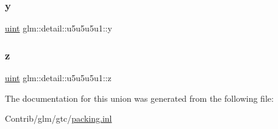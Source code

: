 \subsubsection{\texorpdfstring{y}{y}}
{\footnotesize\ttfamily \mbox{\hyperlink{group__core__precision_ga4fd29415871152bfb5abd588334147c8}{uint}} glm\+::detail\+::u5u5u5u1\+::y}

\mbox{\label{unionglm_1_1detail_1_1u5u5u5u1_a110d067e1f37f6137c2806102c4508f6}} 
\subsubsection{\texorpdfstring{z}{z}}
{\footnotesize\ttfamily \mbox{\hyperlink{group__core__precision_ga4fd29415871152bfb5abd588334147c8}{uint}} glm\+::detail\+::u5u5u5u1\+::z}



The documentation for this union was generated from the following file\+:\begin{DoxyCompactItemize}
\item 
Contrib/glm/gtc/\mbox{\hyperlink{packing_8inl}{packing.\+inl}}\end{DoxyCompactItemize}
